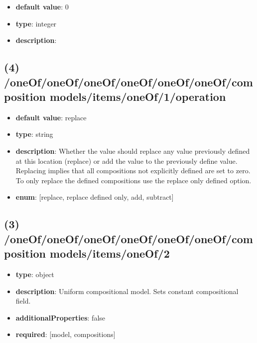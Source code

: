\begin{itemize}[leftmargin=5em]\item {\bf default value}: 0
\item {\bf type}: integer
\item {\bf description}: 
\end{itemize}\subsection{(4) /oneOf/oneOf/oneOf/oneOf/oneOf/oneOf/composition models/items/oneOf/1/operation}
\begin{itemize}[leftmargin=4em]\item {\bf default value}: replace
\item {\bf type}: string
\item {\bf description}: Whether the value should replace any value previously defined at this location (replace) or add the value to the previously define value. Replacing implies that all compositions not explicitly defined are set to zero. To only replace the defined compositions use the replace only defined option.
\item {\bf enum}: [replace, replace defined only, add, subtract]\end{itemize}\subsection{(3) /oneOf/oneOf/oneOf/oneOf/oneOf/oneOf/composition models/items/oneOf/2}
\begin{itemize}[leftmargin=3em]\item {\bf type}: object
\item {\bf description}: Uniform compositional model. Sets constant compositional field.
\item {\bf additionalProperties}: false
\item {\bf required}: [model, compositions]\end{itemize}

